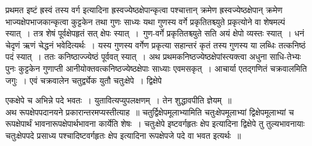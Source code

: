 \documentclass[11pt, openany]{book}
\begin{document}
\noindent प्रथमत इष्टं ह्रस्वं तस्य वर्ग इत्यादिना ह्रस्वज्येष्ठक्षेपान्कृत्वा पश्चात्तान् क्रमेण ह्रस्वज्येष्ठक्षेपान् क्रमेण भाज्यक्षेपभाजकान्कृत्वा कुट्टकेन तथा गुणः 
साध्यः यथा गुणस्य वर्गे प्रकृतितश्च्युते प्रकृत्योने वा शेषमल्पं स्यात्~।
तत्र शेषं पूर्वक्षेपहृतं सत् क्षेपः स्यात्~।~गुण-वर्गे प्रकृतितश्च्युते सति 
अयं क्षेपो व्यस्तः स्यात्~। धनं चेदृणं ऋणं चेद्धनं भवेदित्यर्थः~। 
यस्य गुणस्य वर्गेण प्रकृत्या सहान्तरं कृतं तस्य गुणस्य या लब्धिः 
तत्कनिष्ठं पदं स्यात्~। ततः कनिष्ठाज्ज्येष्ठं पूर्ववत् स्यात्~। अथ प्रथमकनिष्ठज्येष्ठक्षेपांस्त्यक्त्वा अधुना साधि-तेभ्यः पुनः कुट्टकेन गुणाप्ती 
आनीयोक्तवत्कनिष्ठज्येष्ठक्षेपाः साध्याः एवमसकृत्~। आचार्या एतद्गणितं 
चक्रवालमिति जगुः~। एवं चक्रवालेन चतुर्द्व्येक युतौ चतुःक्षेपे~। द्विक्षेपे
\afterpage{\fancyhead[RO,LE]{\textbf{\thepage}}}
\cfoot{}
\thispagestyle{empty}
\newpage

\noindent एकक्षेपे च अभिन्ने पदे भवतः~। युतावित्यप्युपलक्षणम्~। तेन
शुद्धावपीति ज्ञेयम्~॥~\\

\vspace{-3mm}
 अथ रूपक्षेपपदानयने प्रकारान्तरमप्यस्तीत्याह~॥ चतुर्द्विक्षेपमूलाभ्यामिति 
चतुःक्षेपमूलाभ्यां द्विक्षेपमूलाभ्यां च रूपक्षेपार्थं भावनारूपक्षेपार्थभावना 
कार्येति शेषः~। चतुःक्षेपे इष्टवर्गहृतः क्षेप इत्यादिना द्विक्षेपे तु
तुल्यभावनायाः चतुःक्षेपपदे प्रसाध्य पश्चादिष्टवर्गहृतः क्षेप इत्यादिना रूपक्षेपजे 
पदे वा भवत इत्यर्थः~॥~\\
\end{document}
